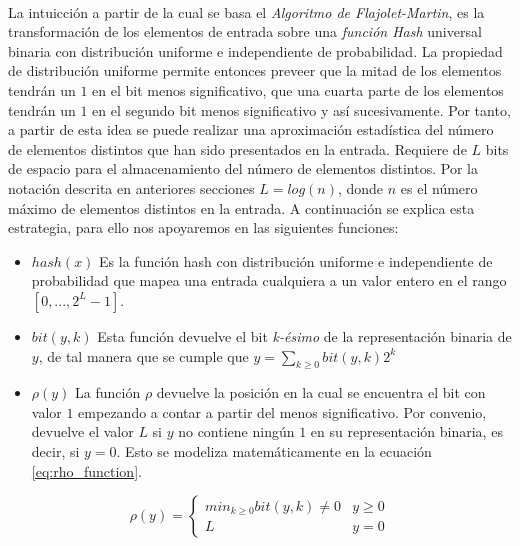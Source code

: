 \documentclass{subfiles}
\begin{document}
      \paragraph{}
      La intuicción a partir de la cual se basa el \emph{Algoritmo de Flajolet-Martin}, es la transformación de los elementos de entrada sobre una \emph{función Hash} universal binaria con distribución uniforme e independiente de probabilidad. La propiedad de distribución uniforme permite entonces preveer que la mitad de los elementos tendrán un $1$ en el bit menos significativo, que una cuarta parte de los elementos tendrán un $1$ en el segundo bit menos significativo y así sucesivamente. Por tanto, a partir de esta idea se puede realizar una aproximación estadística del número de elementos distintos que han sido presentados en la entrada. Requiere de $L$ bits de espacio para el almacenamiento del número de elementos distintos. Por la notación descrita en anteriores secciones $L = log(n)$, donde $n$ es el número máximo de elementos distintos en la entrada. A continuación se explica esta estrategia, para ello nos apoyaremos en las siguientes funciones:

      \begin{itemize}
        \item $hash(x)$ Es la función hash con distribución uniforme e independiente de probabilidad que mapea una entrada cualquiera a un valor entero en el rango $[0,...,2^L-1]$.
        \item $bit(y, k)$ Esta función devuelve el bit \emph{k-ésimo} de la representación binaria de $y$, de tal manera que se cumple que $y = \sum_{k \geq 0} bit(y,k)2^k$
        \item $\rho(y)$ La función $\rho$ devuelve la posición en la cual se encuentra el bit con valor $1$ empezando a contar a partir del menos significativo. Por convenio, devuelve el valor $L$ si $y$ no contiene ningún $1$ en su representación binaria, es decir, si $y = 0$. Esto se modeliza matemáticamente en la ecuación \eqref{eq:rho_function}.
      \end{itemize}

      \begin{equation}
      \label{eq:rho_function}
        \rho(y) =
          \begin{cases}
            min_{k \geq 0} bit(y, k) \neq 0 & y \geq 0\\
            L & y =0
          \end{cases}
      \end{equation}
\end{document}
